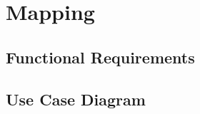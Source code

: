 \section{Mapping}

\subsection{Functional Requirements}

	\begin{flushleft}


	\end{flushleft}

\subsection{Use Case Diagram}
	\begin{center}
	\end{center}
